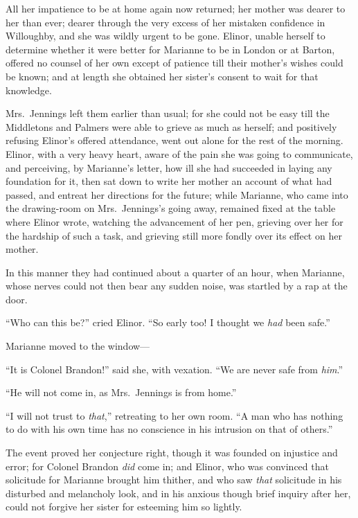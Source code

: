 All her impatience to be at home again now returned;
her mother was dearer to her than ever; dearer through
the very excess of her mistaken confidence in Willoughby,
and she was wildly urgent to be gone.  Elinor, unable herself
to determine whether it were better for Marianne to be
in London or at Barton, offered no counsel of her own
except of patience till their mother's wishes could be known;
and at length she obtained her sister's consent to wait
for that knowledge.

Mrs.\ Jennings left them earlier than usual; for she
could not be easy till the Middletons and Palmers were able
to grieve as much as herself; and positively refusing
Elinor's offered attendance, went out alone for the rest
of the morning.  Elinor, with a very heavy heart, aware of
the pain she was going to communicate, and perceiving,
by Marianne's letter, how ill she had succeeded in laying
any foundation for it, then sat down to write her mother
an account of what had passed, and entreat her directions
for the future; while Marianne, who came into the drawing-room
on Mrs.\ Jennings's going away, remained fixed at the table
where Elinor wrote, watching the advancement of her pen,
grieving over her for the hardship of such a task,
and grieving still more fondly over its effect on her mother.

In this manner they had continued about a quarter
of an hour, when Marianne, whose nerves could not then
bear any sudden noise, was startled by a rap at the door.

``Who can this be?'' cried Elinor.  ``So early too! I
thought we \emph{had} been safe.''

Marianne moved to the window---%

``It is Colonel Brandon!'' said she, with vexation.
``We are never safe from \emph{him}.''

``He will not come in, as Mrs.\ Jennings is from home.''

``I will not trust to \emph{that},'' retreating to her own room.
``A man who has nothing to do with his own time has no
conscience in his intrusion on that of others.''

The event proved her conjecture right, though it
was founded on injustice and error; for Colonel Brandon
\emph{did} come in; and Elinor, who was convinced that
solicitude for Marianne brought him thither, and who saw
\emph{that} solicitude in his disturbed and melancholy look,
and in his anxious though brief inquiry after her,
could not forgive her sister for esteeming him so lightly.

